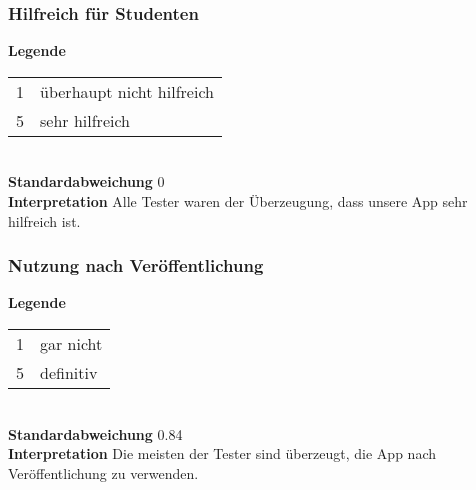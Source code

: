 \begin{frame}\frametitle{Hilfreich für Studenten}
    \begin{minipage}{\textwidth}
        \begin{minipage}{.49\textwidth}
        \end{minipage}
        \begin{minipage}{.49\textwidth}
            \textbf{Legende} 
            \begin{tabular}{l l}
                1 & überhaupt nicht hilfreich \\
                5 & sehr hilfreich
            \end{tabular} \\
            \textbf{Standardabweichung}
            0 \\
            \textbf{Interpretation}
            Alle Tester waren der Überzeugung, dass unsere App sehr hilfreich ist.
        \end{minipage}
    \end{minipage}
\end{frame}

\begin{frame}\frametitle{Nutzung nach Veröffentlichung}
    \begin{minipage}{\textwidth}
        \begin{minipage}{.49\textwidth}
        \end{minipage}
        \begin{minipage}{.49\textwidth}
            \textbf{Legende} 
            \begin{tabular}{l l}
                1 & gar nicht \\
                5 & definitiv
            \end{tabular} \\
            \textbf{Standardabweichung}
            0.84 \\
            \textbf{Interpretation}
            Die meisten der Tester sind überzeugt, die App nach Veröffentlichung zu verwenden.
        \end{minipage}
    \end{minipage}
\end{frame}


